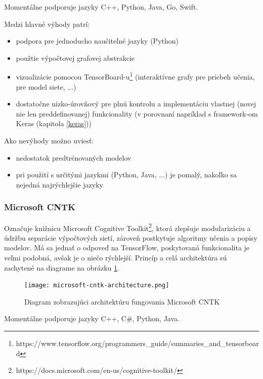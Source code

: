 Momentálne podporuje jazyky C++, Python, Java, Go, Swift.

Medzi hlavné výhody patrí:
\begin{itemize}
	\item podpora pre jednoducho naučiteľné jazyky (Python)
	\item použtie výpočtovej grafovej abstrakcie
	\item vizualizácie pomocou TensorBoard-u\footnote{https://www.tensorflow.org/programmers\_guide/summaries\_and\_tensorboard} (interaktívne grafy pre priebeh učenia, pre model siete, ...)
	\item dostatočne nízko-úrovňový pre plnú kontrolu a implementáciu vlastnej (novej nie len preddefinovanej) funkcionality (v porovnaní napríklad s framework-om Keras (kapitola \ref{keras}))
\end{itemize}

Ako nevýhody možno uviesť:
\begin{itemize}
	\item nedostatok predtrénovaných modelov
	\item pri použití s určitými jazykmi (Python, Java, ...) je pomalý, nakoľko sa nejedná najrýchlejšie jazyky
\end{itemize}

\subsubsection{Microsoft CNTK}
Označuje knižnicu Microsoft Cognitive Toolkit\footnote{https://docs.microsoft.com/en-us/cognitive-toolkit/}, ktorá zlepšuje modularizáciu a údržbu separácie výpočtových sietí, zároveň postkytuje algoritmy učenia a popisy modelov. Má sa jednať o odpoveď na TensorFlow, poskytovaná funkcionalita je veľmi podobná, avšak je o niečo rýchlejší. Princíp a celá architektúra sú zachytené na diagrame na obrázku \ref{cntk_image}. 

\begin{figure}[H]
	\begin{center}\texttt{[image: microsoft-cntk-architecture.png]}
		\caption[Architektúra fungovania Microsoft CNTK]{
			Diagram zobrazujúci architektúru fungovania Microsoft CNTK\footnotemark
		}\label{cntk_image}
	\end{center}
\end{figure}

Momentálne podporuje jazyky C++, C\#, Python, Java.

